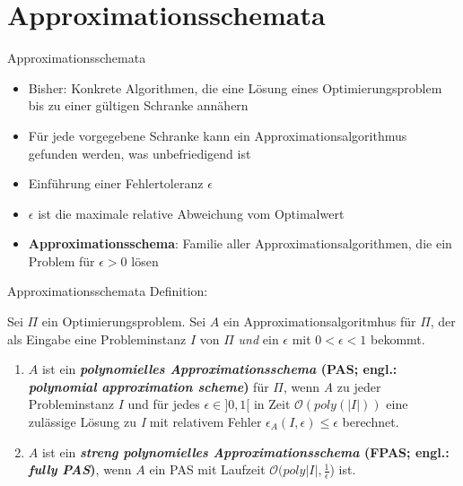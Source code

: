 \section{Approximationsschemata}
\begin{frame}{Approximationsschemata}


\begin{itemize}
\item Bisher: Konkrete Algorithmen, die eine Lösung eines Optimierungsproblem bis zu einer gültigen Schranke annähern
\item Für jede vorgegebene Schranke kann ein Approximationsalgorithmus gefunden werden, was unbefriedigend ist
\item Einführung einer Fehlertoleranz $\epsilon$
\item $\epsilon$ ist die maximale relative Abweichung vom Optimalwert
\item \textbf{Approximationsschema}: Familie aller Approximationsalgorithmen, die ein Problem für $\epsilon > 0$ lösen
\end{itemize}
\end{frame}

\begin{frame}{Approximationsschemata}	
    Definition:
			
Sei $\Pi$ ein Optimierungsproblem. Sei $A$ ein Approximationsalgoritmhus für $\Pi$, der als Eingabe eine Probleminstanz $I$ von $\Pi$ \textit{und} ein $\epsilon$ mit $0 < \epsilon < 1$ bekommt.

\begin{enumerate}
\item
$A$ ist ein \textbf{\textit{polynomielles Approximationsschema} (PAS; engl.: \textit{polynomial approximation scheme})} für $\Pi$, wenn \textit{A} zu jeder Probleminstanz $I$ und für jedes $\epsilon \in ] 0,1 [$ in Zeit $\mathcal O(poly(|I|))$ eine zulässige Lösung zu \textit{I} mit relativem Fehler $\epsilon_A(\textit{I},\epsilon) \leqslant \epsilon$ berechnet.

\item
$A$ ist ein \textbf{\textit{streng polynomielles Approximationsschema} (FPAS; engl.: \textit{fully PAS})}, wenn $A$ ein PAS mit Laufzeit $\mathcal O(poly|I|, \frac{1}{\epsilon}$) ist.

\end{enumerate}		      
\end{frame}

